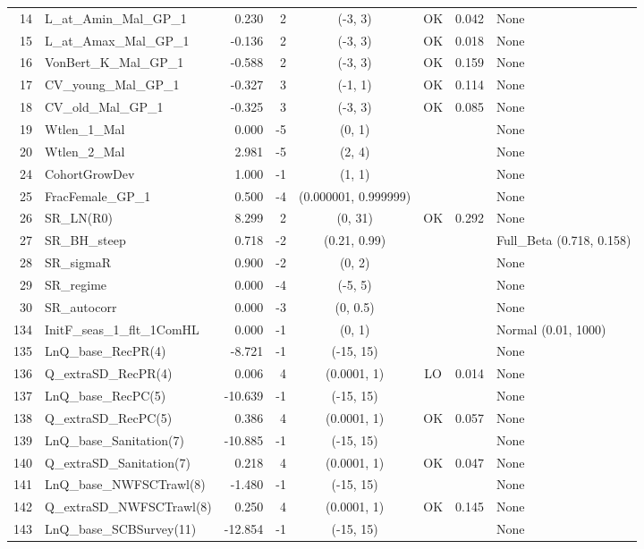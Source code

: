 \documentclass[12pt,]{article}
\begin{document}
\begin{landscape}
\begin{longtable}{rlrrcccl}
  14 & L\_at\_Amin\_Mal\_GP\_1 & 0.230 & 2 & (-3, 3) & OK & 0.042 & None \\ 
  15 & L\_at\_Amax\_Mal\_GP\_1 & -0.136 & 2 & (-3, 3) & OK & 0.018 & None \\ 
  16 & VonBert\_K\_Mal\_GP\_1 & -0.588 & 2 & (-3, 3) & OK & 0.159 & None \\ 
  17 & CV\_young\_Mal\_GP\_1 & -0.327 & 3 & (-1, 1) & OK & 0.114 & None \\ 
  18 & CV\_old\_Mal\_GP\_1 & -0.325 & 3 & (-3, 3) & OK & 0.085 & None \\ 
  19 & Wtlen\_1\_Mal & 0.000 & -5 & (0, 1) &  &  & None \\ 
  20 & Wtlen\_2\_Mal & 2.981 & -5 & (2, 4) &  &  & None \\ 
  24 & CohortGrowDev & 1.000 & -1 & (1, 1) &  &  & None \\ 
  25 & FracFemale\_GP\_1 & 0.500 & -4 & (0.000001, 0.999999) &  &  & None \\ 
  26 & SR\_LN(R0) & 8.299 & 2 & (0, 31) & OK & 0.292 & None \\ 
  27 & SR\_BH\_steep & 0.718 & -2 & (0.21, 0.99) &  &  & Full\_Beta (0.718, 0.158) \\ 
  28 & SR\_sigmaR & 0.900 & -2 & (0, 2) &  &  & None \\ 
  29 & SR\_regime & 0.000 & -4 & (-5, 5) &  &  & None \\ 
  30 & SR\_autocorr & 0.000 & -3 & (0, 0.5) &  &  & None \\ 
  134 & InitF\_seas\_1\_flt\_1ComHL & 0.000 & -1 & (0, 1) &  &  & Normal (0.01, 1000) \\ 
  135 & LnQ\_base\_RecPR(4) & -8.721 & -1 & (-15, 15) &  &  & None \\ 
  136 & Q\_extraSD\_RecPR(4) & 0.006 & 4 & (0.0001, 1) & LO & 0.014 & None \\ 
  137 & LnQ\_base\_RecPC(5) & -10.639 & -1 & (-15, 15) &  &  & None \\ 
  138 & Q\_extraSD\_RecPC(5) & 0.386 & 4 & (0.0001, 1) & OK & 0.057 & None \\ 
  139 & LnQ\_base\_Sanitation(7) & -10.885 & -1 & (-15, 15) &  &  & None \\ 
  140 & Q\_extraSD\_Sanitation(7) & 0.218 & 4 & (0.0001, 1) & OK & 0.047 & None \\ 
  141 & LnQ\_base\_NWFSCTrawl(8) & -1.480 & -1 & (-15, 15) &  &  & None \\ 
  142 & Q\_extraSD\_NWFSCTrawl(8) & 0.250 & 4 & (0.0001, 1) & OK & 0.145 & None \\ 
  143 & LnQ\_base\_SCBSurvey(11) & -12.854 & -1 & (-15, 15) &  &  & None \\ 

\end{longtable}
\end{landscape}
\end{document}
